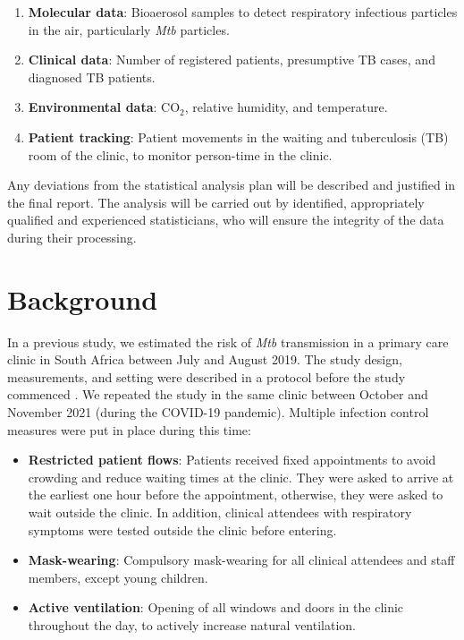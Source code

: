 \documentclass{article}
\begin{document}
\begin{enumerate}
    \item \textbf{Molecular data}: Bioaerosol samples to detect respiratory infectious particles in the air, particularly \emph{Mtb} particles.
    \item \textbf{Clinical data}: Number of registered patients, presumptive TB cases, and diagnosed TB patients. 
    \item \textbf{Environmental data}: CO$_2$, relative humidity, and temperature.
    \item \textbf{Patient tracking}: Patient movements in the waiting and tuberculosis (TB) room of the clinic, to monitor person-time in the clinic.
\end{enumerate}
 
Any deviations from the statistical analysis plan will be described and justified in the final report. The analysis will be carried out by identified, appropriately qualified and experienced statisticians, who will ensure the integrity of the data during their processing. 

\section{Background}

In a previous study, we estimated the risk of \emph{Mtb} transmission in a primary care clinic in South Africa between July and August 2019\cite{Zurcher2022JID}. The study design, measurements, and setting were described in a protocol before the study commenced \cite{Zurcher2020BMJ}. We repeated the study in the same clinic between October and November 2021 (during the COVID-19 pandemic). Multiple infection control measures were put in place during this time:

\begin{itemize}
    \item \textbf{Restricted patient flows}: Patients received fixed appointments to avoid crowding and reduce waiting times at the clinic.  They were asked to arrive at the earliest one hour before the appointment, otherwise, they were asked to wait outside the clinic. In addition, clinical attendees with respiratory symptoms were tested outside the clinic before entering.
    \item \textbf{Mask-wearing}: Compulsory mask-wearing for all clinical attendees and staff members, except young children.
    \item \textbf{Active ventilation}: Opening of all windows and doors in the clinic throughout the day, to actively increase natural ventilation.
\end{itemize}
\end{document}
